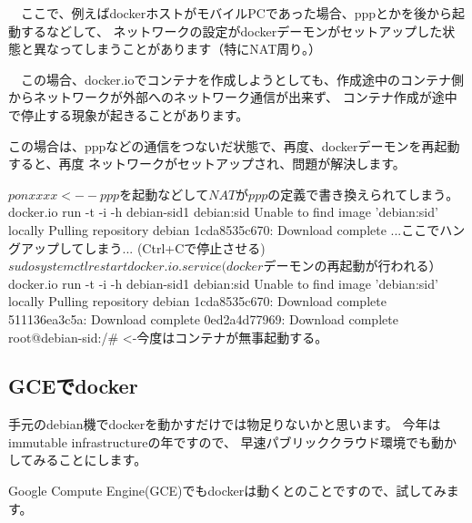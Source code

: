 \documentclass[mingoth,a4paper]{jsarticle}
\begin{document}
　ここで、例えばdockerホストがモバイルPCであった場合、pppとかを後から起動するなどして、
ネットワークの設定がdockerデーモンがセットアップした状態と異なってしまうことがあります（特にNAT周り。）

　この場合、docker.ioでコンテナを作成しようとしても、作成途中のコンテナ側からネットワークが外部へのネットワーク通信が出来ず、
コンテナ作成が途中で停止する現象が起きることがあります。

 この場合は、pppなどの通信をつないだ状態で、再度、dockerデーモンを再起動すると、再度
ネットワークがセットアップされ、問題が解決します。

  \begin{commandline}
$ pon xxxx <-- pppを起動などしてNATがpppの定義で書き換えられてしまう。
$ docker.io run -t -i -h debian-sid1 debian:sid
Unable to find image 'debian:sid' locally
Pulling repository debian
1cda8535c670: Download complete 
...ここでハングアップしてしまう...
(Ctrl+Cで停止させる)
$ sudo systemctl restart docker.io.service 
(dockerデーモンの再起動が行われる）
$ docker.io run -t -i -h debian-sid1 debian:sid
Unable to find image 'debian:sid' locally
Pulling repository debian
1cda8535c670: Download complete 
511136ea3c5a: Download complete 
0ed2a4d77969: Download complete 
root@debian-sid:/#  <-今度はコンテナが無事起動する。
　\end{commandline}

\subsection{GCEでdocker}

 手元のdebian機でdockerを動かすだけでは物足りないかと思います。
今年はimmutable infrastructure\cite{immuta-desc}の年ですので、
早速パブリッククラウド環境でも動かしてみることにします。

 Google Compute Engine(GCE)でもdockerは動くとのことですので、試してみます。
\end{document}
